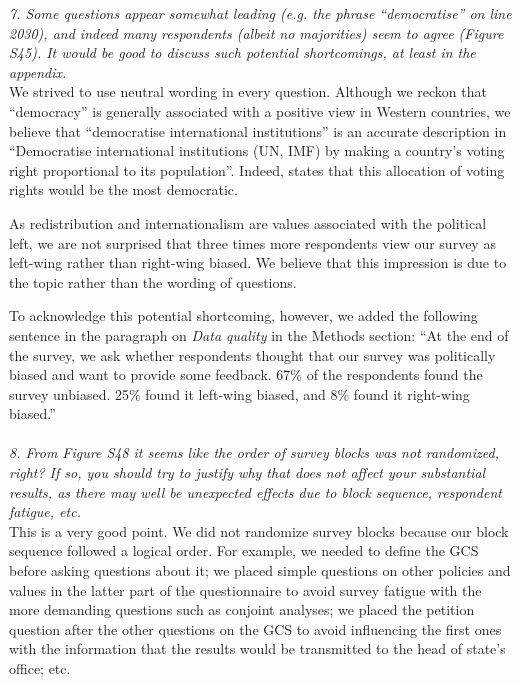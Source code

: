 \documentclass[12pt,english]{article}
\begin{document}
\textit{7. Some questions appear somewhat leading (e.g. the phrase “democratise” on line 2030), and indeed many respondents (albeit no majorities) seem to agree (Figure S45). It would be good to discuss such potential shortcomings, at least in the appendix.}~\\

We strived to use neutral wording in every question. Although we reckon that ``democracy'' is generally associated with a positive view in Western countries, we believe that ``democratise international institutions'' is an accurate description in ``Democratise international institutions (UN, IMF) by making a country's voting right proportional to its population''. Indeed, \citet{woodward_imf_2007} states that this allocation of voting rights would be the most democratic.

As redistribution and internationalism are values associated with the political left, we are not surprised that three times more respondents view our survey as left-wing rather than right-wing biased. We believe that this impression is due to the topic rather than the wording of questions. 

To acknowledge this potential shortcoming, however, we added the following sentence in the paragraph on \textit{Data quality} in the Methods section: ``At the end of the survey, we ask whether respondents thought that our survey was politically biased and want to provide some feedback. 67\% of the respondents found the survey unbiased. 25\% found it left-wing biased, and 8\% found it right-wing biased.''
~\\ ~\\

\textit{8. From Figure S48 it seems like the order of survey blocks was not randomized, right? If so, you should try to justify why that does not affect your substantial results, as there may well be unexpected effects due to block sequence, respondent fatigue, etc.}~\\

This is a very good point. We did not randomize survey blocks because our block sequence followed a logical order. For example, we needed to define the GCS before asking questions about it; we placed simple questions on other policies and values in the latter part of the questionnaire to avoid survey fatigue with the more demanding questions such as conjoint analyses; we placed the petition question after the other questions on the GCS to avoid influencing the first ones with the information that the results would be transmitted to the head of state's office; etc. 
\end{document}
